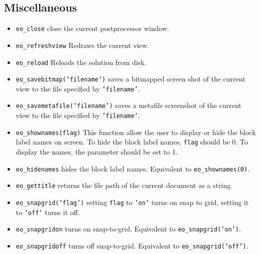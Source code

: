 \subsection{Miscellaneous}

\begin{itemize}

\item \texttt{eo\_close} close the current postprocessor window.

\item{\tt eo\_refreshview} Redraws the current view.

\item{\tt eo\_reload} Reloads the solution from disk.

\item \texttt{eo\_savebitmap('filename')} saves a bitmapped screen shot of the current
view to the file specified by \texttt{'filename'}.

\item \texttt{eo\_savemetafile('filename')} saves a metafile screenshot of the current
view to the file specified by \texttt{'filename'}.

\item \texttt{eo\_shownames(flag)} This function allow the user to display or hide the
block label names on screen. To hide the block label names,
\texttt{flag} should be 0. To display the names, the parameter
should be set to 1.


\item{\tt eo\_hidenames} hides the block label names. Equivalent to {\tt eo\_shownames(0)}.

\item{\tt eo\_gettitle} returns the file path of the current document as a string.

\item{\tt eo\_snapgrid('flag')} setting {\tt flag} to {\tt 'on'} turns on snap to grid, setting it to {\tt 'off'} turns it off.

\item{\tt eo\_snapgridon} turns on snap-to-grid. Equivalent to {\tt eo\_snapgrid('on')}.

\item{\tt eo\_snapgridoff} turns off snap-to-grid. Equivalent to {\tt eo\_snapgrid('off')}.


\end{itemize}
